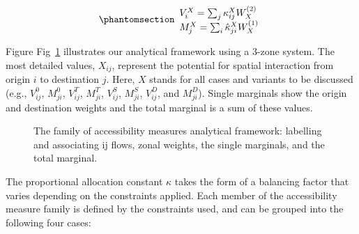 \documentclass[
  10pt,
  letterpaper,
]{article}
\begin{document}
\begin{equation}\phantomsection\label{eq-accesssibility-01}{
\begin{array}{l}
V_{i}^X = \sum_j \kappa_{ij}^X W_X^{(2)}\\
M_{j}^X = \sum_i \hat \kappa_{ji}^X W_X^{(1)}
\end{array}
}\end{equation}

Figure Fig~\ref{fig-analytical-device-conc-accessibility} illustrates
our analytical framework using a 3-zone system. The most detailed
values, \(X_{ij}\), represent the potential for spatial interaction from
origin \(i\) to destination \(j\). Here, \(X\) stands for all cases and
variants to be discussed (e.g., \(V_{ij}^0\), \(M_{ji}^0\),
\(V_{ij}^T\), \(M_{ji}^T\), \(V_{ij}^S\), \(M_{ji}^S\), \(V_{ij}^D\),
and \(M_{ji}^D\)). Single marginals show the origin and destination
weights and the total marginal is a sum of these values.

\begin{figure}[H]


\caption{\label{fig-analytical-device-conc-accessibility}The family of
accessibility measures analytical framework: labelling and associating
ij flows, zonal weights, the single marginals, and the total marginal.}

\end{figure}%

The proportional allocation constant \(\kappa\) takes the form of a
balancing factor that varies depending on the constraints applied. Each
member of the accessibility measure family is defined by the constraints
used, and can be grouped into the following four cases:
\end{document}

